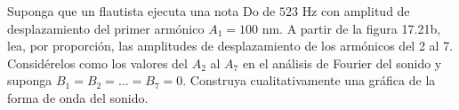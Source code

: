 \item Suponga que un flautista ejecuta una nota Do de $523\text{ Hz}$ con amplitud de desplazamiento del primer armónico $A_1 = 100\text{ nm}$. A partir de la figura 17.21b, lea, por proporción, las amplitudes de desplazamiento de los armónicos del 2 al 7. Considérelos como los valores del $A_2$ al $A_7$ en el análisis de Fourier del sonido y suponga $B_1 = B_2 = \dots = B_7 = 0$. Construya cualitativamente una gráfica de la forma de onda del sonido.